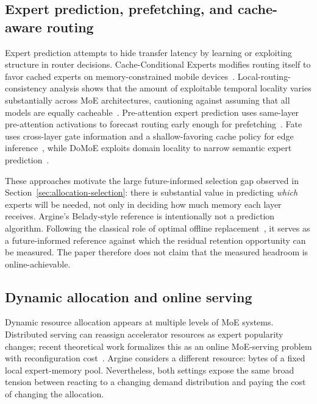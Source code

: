 \subsection{Expert prediction, prefetching, and cache-aware routing}

Expert prediction attempts to hide transfer latency by learning or exploiting structure in router decisions. Cache-Conditional Experts modifies routing itself to favor cached experts on memory-constrained mobile devices~\cite{skliar2024cacheconditional}. Local-routing-consistency analysis shows that the amount of exploitable temporal locality varies substantially across MoE architectures, cautioning against assuming that all models are equally cacheable~\cite{liang2025routingconsistency}. Pre-attention expert prediction uses same-layer pre-attention activations to forecast routing early enough for prefetching~\cite{zhu2025preattention}. Fate uses cross-layer gate information and a shallow-favoring cache policy for edge inference~\cite{fang2026fate}, while DoMoE exploits domain locality to narrow semantic expert prediction~\cite{mu2026domoe}.

These approaches motivate the large future-informed selection gap observed in Section~\ref{sec:allocation-selection}: there is substantial value in predicting \emph{which} experts will be needed, not only in deciding how much memory each layer receives. Argine's Belady-style reference is intentionally not a prediction algorithm. Following the classical role of optimal offline replacement~\cite{belady1966replacement}, it serves as a future-informed reference against which the residual retention opportunity can be measured. The paper therefore does not claim that the measured headroom is online-achievable.

\subsection{Dynamic allocation and online serving}

Dynamic resource allocation appears at multiple levels of MoE systems. Distributed serving can reassign accelerator resources as expert popularity changes; recent theoretical work formalizes this as an online MoE-serving problem with reconfiguration cost~\cite{huang2026moeserving}. Argine considers a different resource: bytes of a fixed local expert-memory pool. Nevertheless, both settings expose the same broad tension between reacting to a changing demand distribution and paying the cost of changing the allocation.

